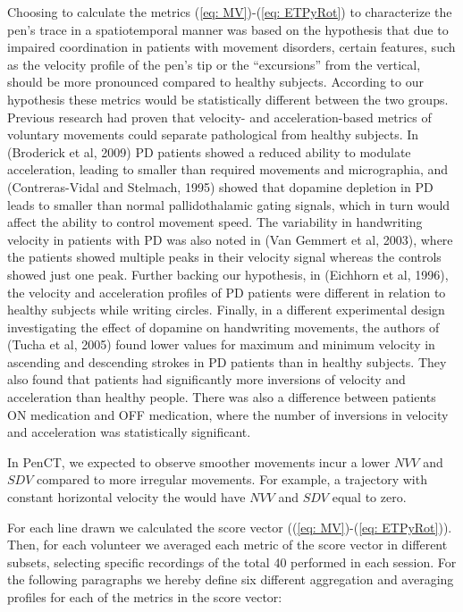 Choosing to calculate the metrics (\ref{eq: MV})-(\ref{eq: ETPyRot}) to characterize the pen's trace in a spatiotemporal manner was based on the hypothesis that due to impaired coordination in patients with movement disorders, certain features, such as the velocity profile of the pen's tip or the ``excursions'' from the vertical, should be more pronounced compared to healthy subjects. According to our hypothesis these metrics would be statistically different between the two groups. Previous research had proven that velocity- and acceleration-based metrics of voluntary movements could separate pathological from healthy subjects. In (Broderick et al, 2009) \gls{PD} patients showed a reduced ability to modulate acceleration, leading to smaller than required movements and micrographia, and (Contreras-Vidal and Stelmach, 1995) showed  that dopamine depletion in \gls{PD} leads to smaller than normal pallidothalamic gating signals, which in turn would affect the ability to control movement speed. The variability in handwriting velocity in patients with \gls{PD} was also noted in (Van Gemmert et al, 2003), where the patients showed multiple peaks in their velocity signal whereas the controls showed just one peak. Further backing our hypothesis, in (Eichhorn et al, 1996), the velocity and acceleration profiles of \gls{PD} patients were different in relation to healthy subjects while writing circles. Finally, in a different experimental design investigating the effect of dopamine on handwriting movements, the authors of (Tucha et al, 2005) found lower values for maximum and minimum velocity in ascending and descending strokes in \gls{PD} patients than in healthy subjects. They also found that patients had significantly more inversions of velocity and acceleration than healthy people. There was also a difference between patients ON medication and OFF medication, where the number of inversions in velocity and acceleration was statistically significant. 

In \gls{PenCT}, we expected to observe smoother movements incur a lower $NVV$ and $SDV$ compared to more irregular movements. For example, a trajectory with constant horizontal velocity the would have $NVV$ and $SDV$ equal to zero.

For each line drawn we calculated the score vector ((\ref{eq: MV})-(\ref{eq: ETPyRot})). Then, for each volunteer we averaged each metric of the score vector in different subsets, selecting specific recordings of the total 40 performed in each session. 
For the following paragraphs we hereby define six different aggregation and averaging profiles for each of the metrics in the score vector: 

